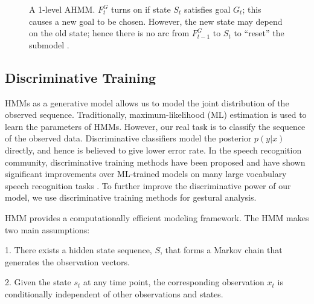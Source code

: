 \begin{figure}[h]
\centering
  \caption{A 1-level AHMM. $F_t^G$ turns on if state $S_t$ satisfies goal
  $G_t$; this causes a new goal to be chosen. However, the new state may depend
  on the old state; hence there is no arc from $F_{t-1}^G$ to $S_t$ to
  ``reset'' the submodel \cite{murphy02}.}
  \label{fig:amms}
\end{figure}

\subsection{Discriminative Training}
HMMs as a generative model allows us to model the joint
distribution of the observed sequence. Traditionally,
maximum-likelihood (ML) estimation is used to learn the parameters of HMMs. However, our real task is to
classify the sequence of the observed data. Discriminative classifiers model the
posterior $p(y|x)$ directly, and hence is believed to give lower error rate. In
the speech recognition community, discriminative training methods have been
proposed and have shown significant improvements over ML-trained models on many
large vocabulary speech recognition tasks \cite {chang12}. To further improve
the discriminative power of our model, we use discriminative training methods
for gestural analysis.

HMM provides a computationally efficient modeling framework. The HMM makes two
main assumptions:

1. There exists a hidden state sequence, $S$, that forms a Markov chain that
generates the observation vectors.

2. Given the state $s_t$ at any time point, the corresponding observation $x_t$
is conditionally independent of other observations and states.

